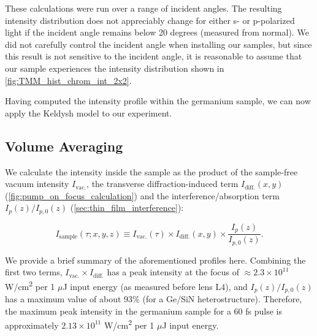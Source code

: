 These calculations were run over a range of incident angles. The resulting intensity distribution does not appreciably change for either s- or p-polarized light if the incident angle remains below 20 degrees (measured from normal). We did not carefully control the incident angle when installing our samples, but since this result is not sensitive to the incident angle, it is reasonable to assume that our sample experiences the intensity distribution shown in \cref{fig:TMM_hist_chrom_int_2x2}.

Having computed the intensity profile within the germanium sample, we can now apply the Keldysh model to our experiment.

\subsection{Volume Averaging}
\label{sec:volume_averaging}

We calculate the intensity inside the sample as the product of the sample-free vacuum intensity $I_{\textrm{vac.}}$, the transverse diffraction-induced term $I_{\textrm{diff.}}(x, y)$ (\cref{fig:pump_on_focus_calculation}) and the interference/absorption term $I_p(z) / I_{p,0}(z)$ (\cref{sec:thin_film_interference}):

\begin{equation}
I_{\textrm{sample}}(\tau; x, y, z) \equiv I_{\textrm{vac.}}(\tau) \times I_{\textrm{diff.}}(x, y) \times \frac{I_p(z)}{I_{p,0}(z)}.
\label{eqn:sample_intensity_XYZtau}
\end{equation}

We provide a brief summary of the aforementioned profiles here. Combining the first two terms, $I_{\textrm{vac.}} \times I_{\textrm{diff.}}$ has a peak intensity at the focus of $\approx 2.3 \times 10^{11}$ W/cm\textsuperscript{2} per 1 $\mu$J input energy (as measured before lens L4), and $I_p(z) / I_{p,0}(z)$ has a maximum value of about 93\% (for a Ge/SiN heterostructure). Therefore, the maximum peak intensity in the germanium sample for a 60 fs pulse is approximately $2.13 \times 10^{11}$ W/cm\textsuperscript{2} per 1 $\mu$J input energy.

